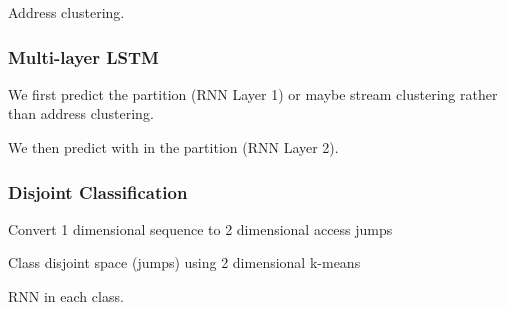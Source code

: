 Address clustering.

\subsubsection{Multi-layer LSTM}

We first predict the partition (RNN Layer 1) or maybe stream clustering rather than address clustering.

We then predict with in the partition (RNN Layer 2).

\subsubsection{Disjoint Classification}

Convert 1 dimensional sequence to 2 dimensional access jumps

Class disjoint space (jumps) using 2 dimensional k-means

RNN in each class.

